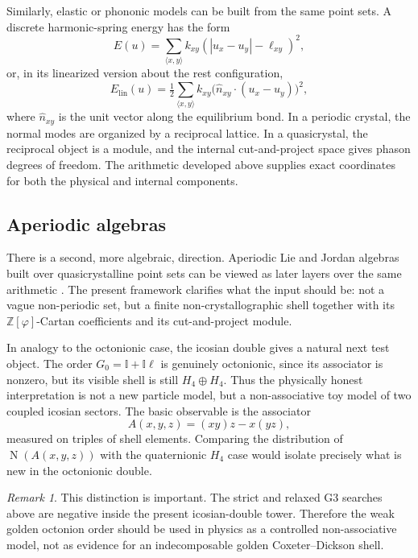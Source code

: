 \documentclass[12pt,oneside,english]{amsart}
\numberwithin{equation}{section}
\numberwithin{figure}{section}
\numberwithin{table}{section}
\theoremstyle{plain}
\theoremstyle{definition}
\theoremstyle{remark}
\newtheorem{remark}[theorem]{Remark}
\newcommand{\Zphi}{\mathbb Z[\varphi]}
\newcommand{\Norm}{\operatorname{N}}
\begin{document}
Similarly, elastic or phononic models can be built from the same point sets. A discrete harmonic-spring energy has the form
\begin{equation}
E(u)=\sum_{\langle x,y\rangle}k_{xy}
\left(|u_x-u_y|-\ell_{xy}\right)^{2},
\label{eq:elastic-energy}
\end{equation}
or, in its linearized version about the rest configuration,
\begin{equation}
E_{\mathrm{lin}}(u)=\tfrac12\sum_{\langle x,y\rangle}k_{xy}\bigl(\hat n_{xy}\cdot(u_x-u_y)\bigr)^{2},
\end{equation}
where \(\hat n_{xy}\) is the unit vector along the equilibrium bond.
In a periodic crystal, the normal modes are organized by a reciprocal lattice. In a quasicrystal, the reciprocal object is a module, and the internal cut-and-project space gives phason degrees of freedom. The arithmetic developed above supplies exact coordinates for both the physical and internal components.

\subsection{Aperiodic algebras}

There is a second, more algebraic, direction. Aperiodic Lie and Jordan algebras built over quasicrystalline point sets can be viewed as later layers over the same arithmetic \cite{CCAI23,CCAI23b,CCAI23c}. The present framework clarifies what the input should be: not a vague non-periodic set, but a finite non-crystallographic shell together with its \(\Zphi\)-Cartan coefficients and its cut-and-project module.

In analogy to the octonionic case, the icosian double gives a natural next test object. The order \(G_0=\mathbb I+\mathbb I\ell\) is genuinely octonionic, since its associator is nonzero, but its visible shell is still \(H_4\oplus H_4\). Thus the physically honest interpretation is not a new particle model, but a non-associative toy model of two coupled icosian sectors. The basic observable is the associator
\begin{equation}
A(x,y,z)=(xy)z-x(yz),
\label{eq:associator-observable}
\end{equation}
measured on triples of shell elements. Comparing the distribution of \(\Norm(A(x,y,z))\) with the quaternionic \(H_4\) case would isolate precisely what is new in the octonionic double.

\begin{remark}
This distinction is important. The strict and relaxed G3 searches above are negative inside the present icosian-double tower. Therefore the weak golden octonion order should be used in physics as a controlled non-associative model, not as evidence for an indecomposable golden Coxeter--Dickson shell.
\end{remark}
\end{document}
